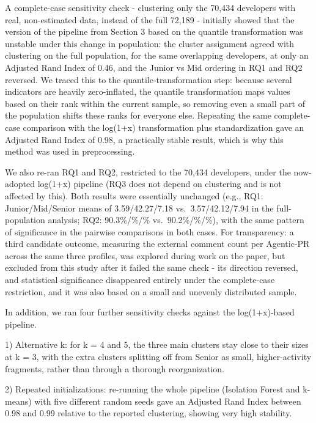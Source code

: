 A complete-case sensitivity check - clustering only the 70,434 developers with real, non-estimated data, instead of the full 72,189 - initially showed that the version of the pipeline from Section 3 based on the quantile transformation was unstable under this change in population: the cluster assignment agreed with clustering on the full population, for the same overlapping developers, at only an Adjusted Rand Index of 0.46, and the Junior vs Mid ordering in RQ1 and RQ2 reversed. We traced this to the quantile-transformation step: because several indicators are heavily zero-inflated, the quantile transformation maps values based on their rank within the current sample, so removing even a small part of the population shifts these ranks for everyone else. Repeating the same complete-case comparison with the log(1+x) transformation plus standardization gave an Adjusted Rand Index of 0.98, a practically stable result, which is why this method was used in preprocessing.

We also re-ran RQ1 and RQ2, restricted to the 70,434 developers, under the now-adopted log(1+x) pipeline (RQ3 does not depend on clustering and is not affected by this). Both results were essentially unchanged (e.g., RQ1: Junior/Mid/Senior means of 3.59/42.27/7.18 vs.\ 3.57/42.12/7.94 in the full-population analysis; RQ2: 90.3\%/\%/\% vs.\ 90.2\%/\%/\%), with the same pattern of significance in the pairwise comparisons in both cases. For transparency: a third candidate outcome, measuring the external comment count per Agentic-PR across the same three profiles, was explored during work on the paper, but excluded from this study after it failed the same check - its direction reversed, and statistical significance disappeared entirely under the complete-case restriction, and it was also based on a small and unevenly distributed sample.

In addition, we ran four further sensitivity checks against the log(1+x)-based pipeline.

1) Alternative k: for k = 4 and 5, the three main clusters stay close to their sizes at k = 3, with the extra clusters splitting off from Senior as small, higher-activity fragments, rather than through a thorough reorganization.

2) Repeated initializations: re-running the whole pipeline (Isolation Forest and k-means) with five different random seeds gave an Adjusted Rand Index between 0.98 and 0.99 relative to the reported clustering, showing very high stability.

